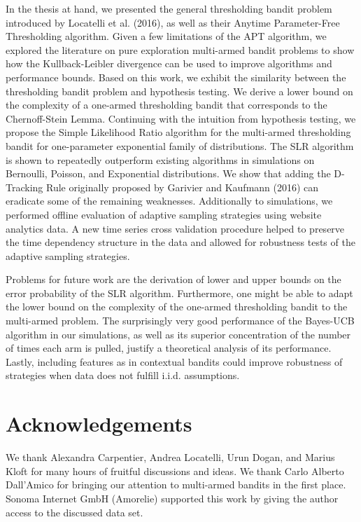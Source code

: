 \documentclass[11pt,]{article}
\begin{document}
In the thesis at hand, we presented the general thresholding bandit
problem introduced by Locatelli et al. (2016), as well as their Anytime
Parameter-Free Thresholding algorithm. Given a few limitations of the
APT algorithm, we explored the literature on pure exploration
multi-armed bandit problems to show how the Kullback-Leibler divergence
can be used to improve algorithms and performance bounds. Based on this
work, we exhibit the similarity between the thresholding bandit problem
and hypothesis testing. We derive a lower bound on the complexity of a
one-armed thresholding bandit that corresponds to the Chernoff-Stein
Lemma. Continuing with the intuition from hypothesis testing, we propose
the Simple Likelihood Ratio algorithm for the multi-armed thresholding
bandit for one-parameter exponential family of distributions. The SLR
algorithm is shown to repeatedly outperform existing algorithms in
simulations on Bernoulli, Poisson, and Exponential distributions. We
show that adding the D-Tracking Rule originally proposed by Garivier and
Kaufmann (2016) can eradicate some of the remaining weaknesses.
Additionally to simulations, we performed offline evaluation of adaptive
sampling strategies using website analytics data. A new time series
cross validation procedure helped to preserve the time dependency
structure in the data and allowed for robustness tests of the adaptive
sampling strategies.

Problems for future work are the derivation of lower and upper bounds on
the error probability of the SLR algorithm. Furthermore, one might be
able to adapt the lower bound on the complexity of the one-armed
thresholding bandit to the multi-armed problem. The surprisingly very
good performance of the Bayes-UCB algorithm in our simulations, as well
as its superior concentration of the number of times each arm is pulled,
justify a theoretical analysis of its performance. Lastly, including
features as in contextual bandits could improve robustness of strategies
when data does not fulfill i.i.d. assumptions.

\section{Acknowledgements}\label{acknowledgements}

We thank Alexandra Carpentier, Andrea Locatelli, Urun Dogan, and Marius
Kloft for many hours of fruitful discussions and ideas. We thank Carlo
Alberto Dall'Amico for bringing our attention to multi-armed bandits in
the first place. Sonoma Internet GmbH (Amorelie) supported this work by
giving the author access to the discussed data set.
\end{document}
